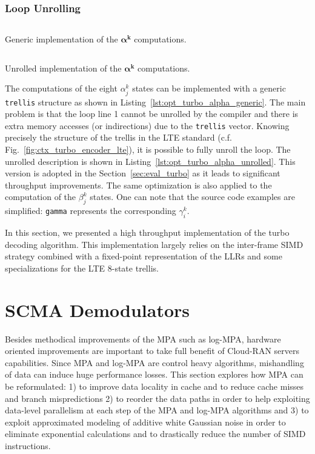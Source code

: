\subsubsection{Loop Unrolling}

\begin{listing}[htp]
  \inputminted[frame=lines,linenos]{C++}{\curChapter/src/turbo/alpha_generic.cpp}
  \caption{Generic implementation of the $\bm{\alpha^k}$ computations.}
  \label{lst:opt_turbo_alpha_generic}
\end{listing}

\begin{listing}[htp]
  \inputminted[frame=lines,linenos]{C++}{\curChapter/src/turbo/alpha_unrolled.cpp}
  \caption{Unrolled implementation of the $\bm{\alpha^k}$ computations.}
  \label{lst:opt_turbo_alpha_unrolled}
\end{listing}

The computations of the eight $\alpha^k_j$ states can be implemented with
a generic \verb|trellis| structure as shown in
Listing~\ref{lst:opt_turbo_alpha_generic}. The main problem is that the loop
line 1 cannot be unrolled by the compiler and there is extra memory accesses (or
indirections) due to the \verb|trellis| vector. Knowing precisely the structure
of the trellis in the LTE standard (c.f. Fig.~\ref{fig:ctx_turbo_encoder_lte}),
it is possible to fully unroll the loop. The unrolled description is shown in
Listing~\ref{lst:opt_turbo_alpha_unrolled}. This version is adopted in
the Section~\ref{sec:eval_turbo} as it leads to significant throughput
improvements. The same optimization is also applied to the computation of the
$\beta^k_j$ states. One can note that the source code examples are simplified:
\verb|gamma| represents the corresponding $\gamma^k_i$.

In this section, we presented a high throughput implementation of the turbo
decoding algorithm. This implementation largely relies on the inter-frame SIMD
strategy combined with a fixed-point representation of the LLRs and some
specializations for the LTE 8-state trellis.

\section{SCMA Demodulators}
\label{sec:opt_scma}

Besides methodical improvements of the MPA such as log-MPA, hardware oriented
improvements are important to take full benefit of Cloud-RAN servers
capabilities. Since MPA and log-MPA are control heavy algorithms, mishandling of
data can induce huge performance losses. This section explores how MPA can be
reformulated: 1) to improve data locality in cache and to reduce cache misses
and branch mispredictions 2) to reorder the data paths in order to help
exploiting data-level parallelism at each step of the MPA and log-MPA algorithms
and 3) to exploit approximated modeling of additive white Gaussian noise in
order to eliminate exponential calculations and to drastically reduce the number
of SIMD instructions.

